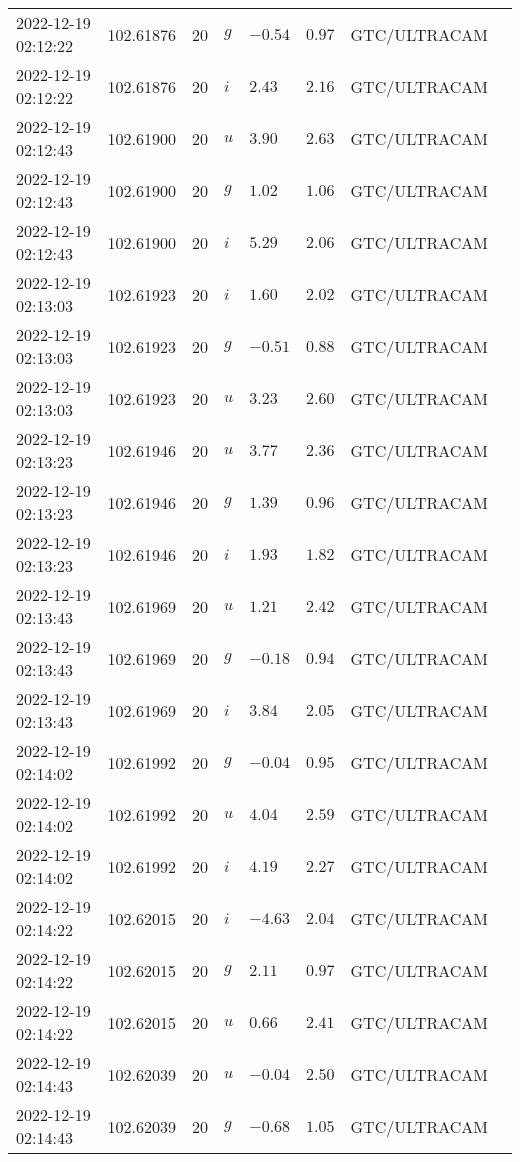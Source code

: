 \documentclass{nature_plusfigure}
\begin{document}
\begin{supplement}
\begin{center}
\begin{longtable}{llllllll}
2022-12-19 02:12:22 & 102.61876 & 20 & $g$ & $-0.54$ & $0.97$ & GTC/ULTRACAM &  \\ 
2022-12-19 02:12:22 & 102.61876 & 20 & $i$ & $2.43$ & $2.16$ & GTC/ULTRACAM &  \\ 
2022-12-19 02:12:43 & 102.61900 & 20 & $u$ & $3.90$ & $2.63$ & GTC/ULTRACAM &  \\ 
2022-12-19 02:12:43 & 102.61900 & 20 & $g$ & $1.02$ & $1.06$ & GTC/ULTRACAM &  \\ 
2022-12-19 02:12:43 & 102.61900 & 20 & $i$ & $5.29$ & $2.06$ & GTC/ULTRACAM &  \\ 
2022-12-19 02:13:03 & 102.61923 & 20 & $i$ & $1.60$ & $2.02$ & GTC/ULTRACAM &  \\ 
2022-12-19 02:13:03 & 102.61923 & 20 & $g$ & $-0.51$ & $0.88$ & GTC/ULTRACAM &  \\ 
2022-12-19 02:13:03 & 102.61923 & 20 & $u$ & $3.23$ & $2.60$ & GTC/ULTRACAM &  \\ 
2022-12-19 02:13:23 & 102.61946 & 20 & $u$ & $3.77$ & $2.36$ & GTC/ULTRACAM &  \\ 
2022-12-19 02:13:23 & 102.61946 & 20 & $g$ & $1.39$ & $0.96$ & GTC/ULTRACAM &  \\ 
2022-12-19 02:13:23 & 102.61946 & 20 & $i$ & $1.93$ & $1.82$ & GTC/ULTRACAM &  \\ 
2022-12-19 02:13:43 & 102.61969 & 20 & $u$ & $1.21$ & $2.42$ & GTC/ULTRACAM &  \\ 
2022-12-19 02:13:43 & 102.61969 & 20 & $g$ & $-0.18$ & $0.94$ & GTC/ULTRACAM &  \\ 
2022-12-19 02:13:43 & 102.61969 & 20 & $i$ & $3.84$ & $2.05$ & GTC/ULTRACAM &  \\ 
2022-12-19 02:14:02 & 102.61992 & 20 & $g$ & $-0.04$ & $0.95$ & GTC/ULTRACAM &  \\ 
2022-12-19 02:14:02 & 102.61992 & 20 & $u$ & $4.04$ & $2.59$ & GTC/ULTRACAM &  \\ 
2022-12-19 02:14:02 & 102.61992 & 20 & $i$ & $4.19$ & $2.27$ & GTC/ULTRACAM &  \\ 
2022-12-19 02:14:22 & 102.62015 & 20 & $i$ & $-4.63$ & $2.04$ & GTC/ULTRACAM &  \\ 
2022-12-19 02:14:22 & 102.62015 & 20 & $g$ & $2.11$ & $0.97$ & GTC/ULTRACAM &  \\ 
2022-12-19 02:14:22 & 102.62015 & 20 & $u$ & $0.66$ & $2.41$ & GTC/ULTRACAM &  \\ 
2022-12-19 02:14:43 & 102.62039 & 20 & $u$ & $-0.04$ & $2.50$ & GTC/ULTRACAM &  \\ 
2022-12-19 02:14:43 & 102.62039 & 20 & $g$ & $-0.68$ & $1.05$ & GTC/ULTRACAM &  \\ 

\end{longtable}
\end{center}
\end{supplement}
\end{document}
